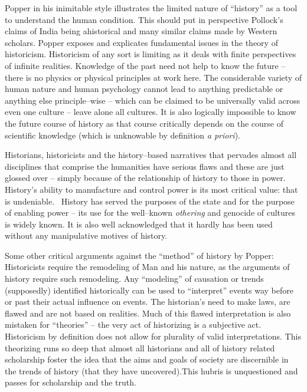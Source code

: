 Popper in his inimitable style illustrates the limited nature of “history” as a tool to understand the human condition. This should put in perspective Pollock’s claims of India being ahistorical and many similar claims made by Western scholars. Popper exposes and explicates fundamental issues in the theory of historicism. Historicism of any sort is limiting as it deals with finite perspectives of infinite realities. Knowledge of the past need not help to know the future – there is no physics or physical principles at work here. The considerable variety of human nature and human psychology cannot lead to anything predictable or anything else principle–wise – which can be claimed to be universally valid across even one culture – leave alone all cultures. It is also logically impossible to know the future course of history as that course critically depends on the course of scientific knowledge (which is unknowable by definition \textit{a priori}).

Historians, historicists and the history–based narratives that pervades almost all disciplines that comprise the humanities have serious flaws and these are just glossed over – simply because of the relationship of history to those in power. History’s ability to manufacture and control power is its most critical value: that is undeniable.  History has served the purposes of the state and for the purpose of enabling power – its use for the well–known \textit{othering} and genocide of cultures is widely known. It is also well acknowledged that it hardly has been used without any manipulative motives of history.

Some other critical arguments against the “method” of history by Popper: Historicists require the remodeling of Man and his nature, as the arguments of history require such remodeling. Any “modeling” of causation or trends (supposedly) identified historically can be used to “interpret” events way before or past their actual influence on events. The historian’s need to make laws, are flawed and are not based on realities. Much of this flawed interpretation is also mistaken for “theories” – the very act of historizing is a subjective act. Historicism by definition does not allow for plurality of valid interpretations. This theorizing runs so deep that almost all historians and all of history related scholarship foster the idea that the aims and goals of society are discernible in the trends of history (that they have uncovered).This hubris is unquestioned and passes for scholarship and the truth.

